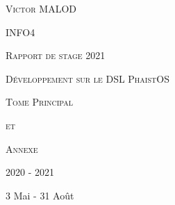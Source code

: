 \begin{titlepage}
    \hfill
    \vfill
    
    \centering
    {\scshape \Large Victor MALOD \par}
    {\scshape \Large INFO4 \par}
    {\scshape \Large Rapport de stage 2021 \par}
    
    \vfill
    {\scshape \huge Développement sur le DSL PhaistOS \par}
    
    \vfill
    {\scshape\Large Tome Principal \par}
    {\scshape \Large et \par}
    {\scshape \Large Annexe \par}
    
    \vfill
    {\Large 2020 - 2021 \par}
    {\Large 3 Mai - 31 Août \par}
\end{titlepage}